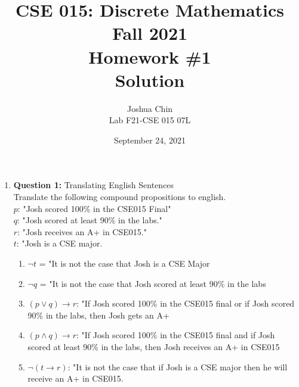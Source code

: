 \documentclass[11pt]{article}
\begin{document}
\author{Joshua Chin\\
Lab F21-CSE 015 07L}

\title{CSE 015: Discrete Mathematics\\
Fall 2021\\
Homework \#1\\
Solution}

\date{September 24, 2021}
\maketitle

\begin{enumerate}

\item
\textbf{Question 1:}
Translating English Sentences \\
Translate the following compound propositions to english. \\
$p$: "Josh scored 100\% in the CSE015 Final" \\
$q$: "Josh scored at least 90\% in the labs."\\
$r$: "Josh receives an A+ in CSE015." \\
$t$: "Josh is a CSE major.\\

\begin{enumerate}[label=(\alph*)]
\item
$\lnot t$ = "It is not the case that Josh is a CSE Major
\item
$\lnot q$ = "It is not the case that Josh scored at least 90\% in the labs
\item
$(p \vee q) \rightarrow r$: "If Josh scored 100\% in the CSE015 final or if Josh scored 90\% in the labs, then Josh gets an A+
\item 
$(p\wedge q) \rightarrow r$: "If Josh scored 100\% in the CSE015 final and if Josh scored at least 90\% in the labs, then Josh receives an A+ in CSE015
\item 
$\lnot(t \rightarrow r)$: "It is not the case that if Josh is a CSE major then he will receive an A+ in CSE015.
\end{enumerate}



\end{enumerate}
\end{document}
